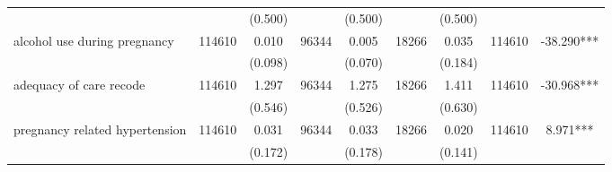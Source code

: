 \begin{tabular}{@{\extracolsep{5pt}}lcccccccc}
 &   & (0.500)  &   & (0.500)  &   & (0.500)  &   &  \\ [1ex]                                                                                                                                                                                                                                                                                                  
alcohol use during pregnancy   & 114610    & 0.010    & 96344    & 0.005    & 18266    & 0.035    & 114610    & -38.290***   \\                                                                                                                                                                                                                                
 &   & (0.098)  &   & (0.070)  &   & (0.184)  &   &  \\ [1ex]                                                                                                                                                                                                                                                                                                  
adequacy of care recode   & 114610    & 1.297    & 96344    & 1.275    & 18266    & 1.411    & 114610    & -30.968***   \\                                                                                                                                                                                                                                     
 &   & (0.546)  &   & (0.526)  &   & (0.630)  &   &  \\ [1ex]                                                                                                                                                                                                                                                                                                  
pregnancy related hypertension   & 114610    & 0.031    & 96344    & 0.033    & 18266    & 0.020    & 114610    & 8.971***   \\                                                                                                                                                                                                                                
 &   & (0.172)  &   & (0.178)  &   & (0.141)  &   &  \\ [1ex]                                                                                                                                                                                                                                                                                                  

\end{tabular}
